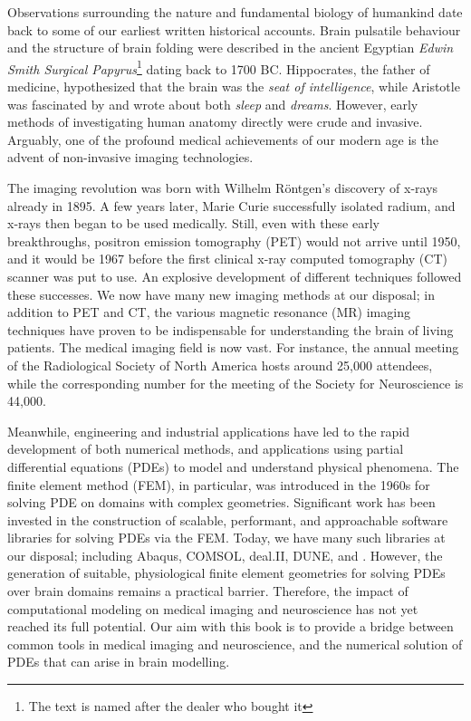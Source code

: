 %
%

\preface

Observations surrounding the nature and fundamental biology of
humankind date back to some of our earliest written historical
accounts.  Brain pulsatile behaviour and the structure of brain
folding were described in the ancient Egyptian \textit{Edwin Smith
Surgical Papyrus}\footnote{The text is named after the dealer who
bought it} dating back to 1700 BC.  Hippocrates, the father of
medicine, hypothesized that the brain was the \textit{seat of
intelligence}, while Aristotle was fascinated by and wrote about
both \textit{sleep} and \textit{dreams}. However, early methods of
investigating human anatomy directly were crude and invasive.
Arguably, one of the profound medical achievements of our modern age
is the advent of non-invasive imaging technologies.

The imaging revolution was born with Wilhelm R{\"o}ntgen's discovery of
x-rays already in 1895. A few years later, Marie Curie successfully
isolated radium, and x-rays then began to be used medically. Still,
even with these early breakthroughs, positron emission tomography
(PET) would not arrive until 1950, and it would be 1967 before the
first clinical x-ray computed tomography (CT) scanner was put to use.
An explosive development of different techniques followed these
successes.  We now have many new imaging methods at our disposal; in
addition to PET and CT, the various magnetic resonance (MR) imaging
techniques have proven to be indispensable for understanding the brain
of living patients. The medical imaging field is now vast. For
instance, the annual meeting of the Radiological Society of North
America hosts around 25,000 attendees, while the corresponding number
for the meeting of the Society for Neuroscience is 44,000.

Meanwhile, engineering and industrial applications have led to the
rapid development of both numerical methods, and applications using
partial differential equations (PDEs) to model and understand physical
phenomena. The finite element method (FEM), in particular, was
introduced in the 1960s for solving PDE on domains with complex
geometries. Significant work has been invested in the construction of
scalable, performant, and approachable software libraries for solving
PDEs via the FEM. Today, we have many such libraries at our disposal;
including Abaqus, COMSOL, deal.II, DUNE, and {\fenics}. However, the
generation of suitable, physiological finite element geometries for
solving PDEs over brain domains remains a practical
barrier. Therefore, the impact of computational modeling on medical
imaging and neuroscience has not yet reached its full potential. Our
aim with this book is to provide a bridge between common tools in
medical imaging and neuroscience, and the numerical solution of PDEs
that can arise in brain modelling.

